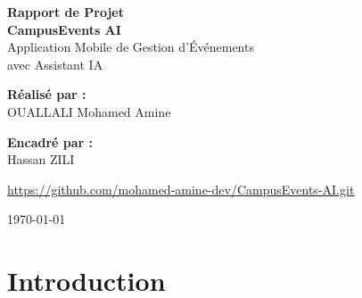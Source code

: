 \documentclass[a4paper,12pt]{report}
\begin{document}
\begin{titlepage}
    \centering
    \vspace*{2cm}

    {\Huge\bfseries\color{tealdark} Rapport de Projet}\\[1.5cm]

    {\LARGE\bfseries\color{tealprimary} CampusEvents AI}\\[0.5cm]
    {\Large Application Mobile de Gestion d'\'{E}v\'{e}nements\\ avec Assistant IA}\\[2.5cm]

    \begin{minipage}{0.8\textwidth}
        \large
        \begin{minipage}[t]{0.45\textwidth}
            \raggedright
            \textbf{R\'{e}alis\'{e} par :}\\[0.3cm]
            {\Large OUALLALI Mohamed Amine}
        \end{minipage}
        \hfill
        \begin{minipage}[t]{0.45\textwidth}
            \raggedleft
            \textbf{Encadr\'{e} par :}\\[0.3cm]
            {\Large Hassan ZILI}
        \end{minipage}

        \vspace{1.5cm}
        \centering
        \href{https://github.com/mohamed-amine-dev/CampusEvents-AI.git}{\Large\color{tealprimary}\underline{https://github.com/mohamed-amine-dev/CampusEvents-AI.git}}

        \vspace{1.5cm}
        \centering
        \large
        \today
    \end{minipage}

    \vfill
\end{titlepage}

\tableofcontents
\newpage

\chapter*{Introduction}
\end{document}
